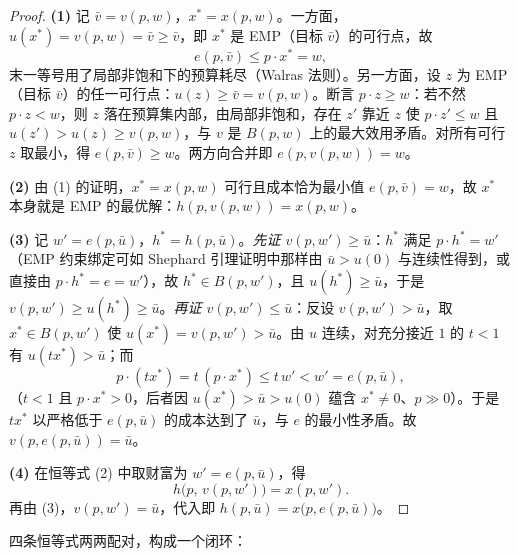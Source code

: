 \begin{proof}
\textbf{(1)} 记 $\bar v=v(p,w)$，$x^*=x(p,w)$。一方面，$u(x^*)=v(p,w)=\bar v\ge\bar v$，即 $x^*$ 是 EMP（目标 $\bar v$）的可行点，故
\[
 e(p,\bar v)\le p\cdot x^*=w,
\]
末一等号用了局部非饱和下的预算耗尽（Walras 法则）。另一方面，设 $z$ 为 EMP（目标 $\bar v$）的任一可行点：$u(z)\ge\bar v=v(p,w)$。断言 $p\cdot z\ge w$：若不然 $p\cdot z<w$，则 $z$ 落在预算集内部，由局部非饱和，存在 $z'$ 靠近 $z$ 使 $p\cdot z'\le w$ 且 $u(z')>u(z)\ge v(p,w)$，与 $v$ 是 $B(p,w)$ 上的最大效用矛盾。对所有可行 $z$ 取最小，得 $e(p,\bar v)\ge w$。两方向合并即 $e(p,v(p,w))=w$。

\textbf{(2)} 由 (1) 的证明，$x^*=x(p,w)$ 可行且成本恰为最小值 $e(p,\bar v)=w$，故 $x^*$ 本身就是 EMP 的最优解：$h(p,v(p,w))=x(p,w)$。

\textbf{(3)} 记 $w'=e(p,\bar u)$，$h^*=h(p,\bar u)$。\emph{先证 $v(p,w')\ge\bar u$}：$h^*$ 满足 $p\cdot h^*=w'$（EMP 约束绑定可如 Shephard 引理证明中那样由 $\bar u>u(0)$ 与连续性得到，或直接由 $p\cdot h^*=e=w'$），故 $h^*\in B(p,w')$，且 $u(h^*)\ge\bar u$，于是 $v(p,w')\ge u(h^*)\ge\bar u$。\emph{再证 $v(p,w')\le\bar u$}：反设 $v(p,w')>\bar u$，取 $x^*\in B(p,w')$ 使 $u(x^*)=v(p,w')>\bar u$。由 $u$ 连续，对充分接近 $1$ 的 $t<1$ 有 $u(t x^*)>\bar u$；而
\[
 p\cdot(t x^*)=t\,(p\cdot x^*)\le t\,w'<w'=e(p,\bar u),
\]
（$t<1$ 且 $p\cdot x^*>0$，后者因 $u(x^*)>\bar u>u(0)$ 蕴含 $x^*\ne0$、$p\gg0$）。于是 $t x^*$ 以严格低于 $e(p,\bar u)$ 的成本达到了 $\bar u$，与 $e$ 的最小性矛盾。故 $v(p,e(p,\bar u))=\bar u$。

\textbf{(4)} 在恒等式 (2) 中取财富为 $w'=e(p,\bar u)$，得
\[
 h\bigl(p,\,v(p,w')\bigr)=x(p,w').
\]
再由 (3)，$v(p,w')=\bar u$，代入即 $h(p,\bar u)=x\bigl(p,e(p,\bar u)\bigr)$。
\end{proof}

四条恒等式两两配对，构成一个闭环：

\begin{center}
\end{center}


